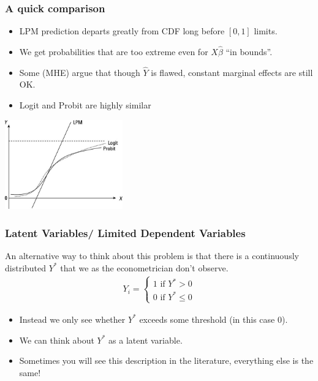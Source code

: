 \begin{frame}
       \frametitle{A quick comparison}
       \begin{itemize}
       \item LPM prediction departs greatly from CDF long before $[0,1]$ limits.
       \item We get probabilities that are too extreme even for $X\hat{\beta}$ ``in bounds''.
       \item Some (MHE) argue that though $\hat{Y}$ is flawed, constant marginal effects are still OK.
       \item Logit and Probit are highly similar
       \end{itemize}
       \begin{center}
       \includegraphics[width=2in]{resources/lpm-probit.jpg}
       \end{center}
\end{frame}


\begin{frame}
       \frametitle{Latent Variables/ Limited Dependent Variables}
       An alternative way to think about this problem is that there is a continuously distributed $Y^{*}$ that we as the econometrician don't observe.
       \begin{eqnarray*}
       Y_i =
       \begin{cases}
       1 \mbox{ if } Y^{*} >0 \\
       0 \mbox{ if } Y^{*} \leq 0
       \end{cases}
       \end{eqnarray*}
       \begin{itemize}
       \item Instead we only see whether $Y^{*}$ exceeds some threshold (in this case $0$).
       \item We can think about $Y^{*}$ as a \alert{latent variable}.
       \item Sometimes you will see this description in the literature, everything else is the same!
       \end{itemize}
\end{frame}
       
